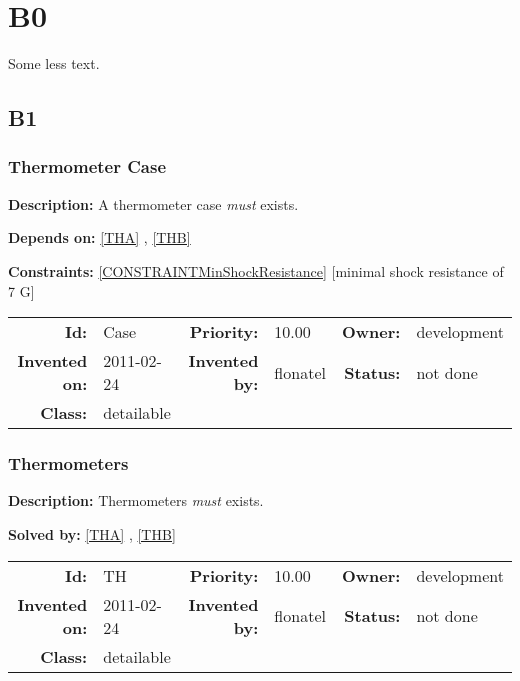 \chapter{B0}
Some less text.
\section{B1}
\subsection{Thermometer Case}\label{Case}
\textbf{Description:} A thermometer case \textsl{must} exists.

\textbf{Depends on:} \ref{THA} , \ref{THB} 

\textbf{Constraints:} \ref{CONSTRAINTMinShockResistance}  [minimal shock resistance of 7 G] 

\par
{\small \begin{center}\begin{tabular}{rlrlrl}
\textbf{Id:} & Case  & \textbf{Priority:} & 10.00  & \textbf{Owner:} & development\\ 
\textbf{Invented on:} & 2011-02-24  & \textbf{Invented by:} & flonatel  & \textbf{Status:} & not done \\ 
\textbf{Class:} & detailable  & & & \end{tabular}\end{center} }

\subsection{Thermometers}\label{TH}
\textbf{Description:} Thermometers \textsl{must} exists.

\textbf{Solved by:} \ref{THA} , \ref{THB} 

\par
{\small \begin{center}\begin{tabular}{rlrlrl}
\textbf{Id:} & TH  & \textbf{Priority:} & 10.00  & \textbf{Owner:} & development\\ 
\textbf{Invented on:} & 2011-02-24  & \textbf{Invented by:} & flonatel  & \textbf{Status:} & not done \\ 
\textbf{Class:} & detailable  & & & \end{tabular}\end{center} }

